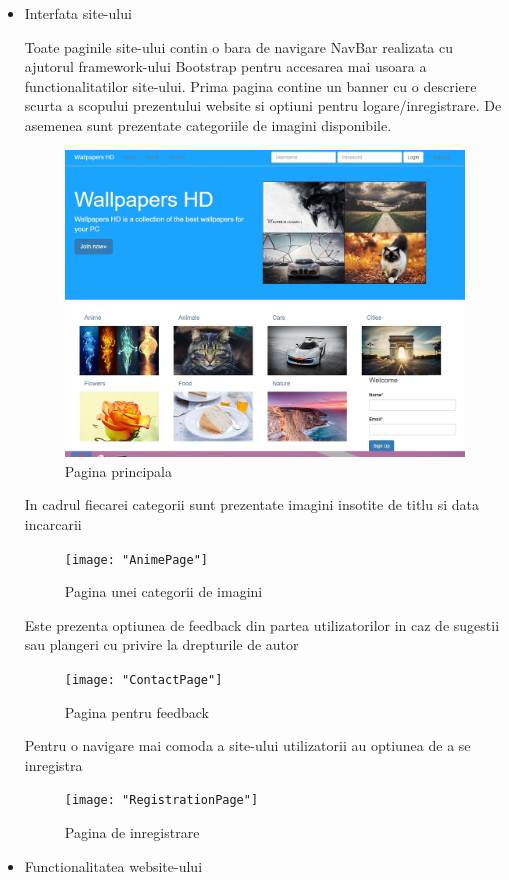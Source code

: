\begin{itemize}
	\item Interfata site-ului
	

	Toate paginile site-ului contin o bara de navigare NavBar realizata cu ajutorul framework-ului Bootstrap pentru accesarea mai usoara a functionalitatilor site-ului.
	Prima pagina contine un banner cu o descriere scurta a scopului prezentului website si optiuni pentru logare/inregistrare. De asemenea sunt prezentate categoriile de imagini disponibile.	
		\begin{figure}[h!]
			\centering
 			 \includegraphics[scale=0.5]{"FrontPage"}
 			 \caption{Pagina principala}
 			 \label{fig:Pagina principala}
		\end{figure}	
	\newpage
	In cadrul fiecarei categorii sunt prezentate imagini insotite de titlu si data incarcarii
	
	\begin{figure}[h!]
			\centering
 			 \texttt{[image: "AnimePage"]}
 			 \caption{Pagina unei categorii de imagini}
 			 \label{fig:AnimePage}
		\end{figure}
\newpage
	Este prezenta optiunea de feedback din partea utilizatorilor in caz de sugestii sau plangeri cu privire la drepturile de autor
	
	\begin{figure}[h!]
			\centering
 			 \texttt{[image: "ContactPage"]}
 			 \caption{Pagina pentru feedback}
 			 \label{fig:Calcui}
		\end{figure}
		
	Pentru o navigare mai comoda a site-ului utilizatorii au optiunea de a se inregistra
	\newpage
	\begin{figure}[h!]
			\centering
 			 \texttt{[image: "RegistrationPage"]}
 			 \caption{Pagina de inregistrare}
 			 \label{fig:Calcui}
		\end{figure}
\newpage
	\item Functionalitatea website-ului
	

\end{itemize}
